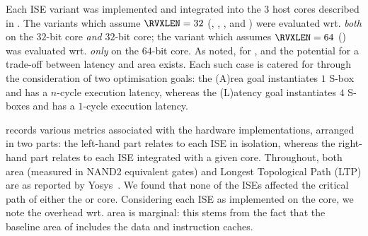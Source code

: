 
Each ISE variant was implemented and integrated into the $3$ host cores 
described in .
The variants which assume  $\RVXLEN = 32$
(, , , and ) 
were evaluated wrt.
{\em both}
on the
$32$-bit  core
{\em  and}
$32$-bit  core;
the variant  which assumes $\RVXLEN = 64$
()
was  evaluated wrt.
{\em only}
on the
$64$-bit  core.
As noted, for ,  and  the potential for a trade-off
between latency and area exists.  Each such case is catered for through
the consideration of two optimisation goals:
the (A)rea    goal
instantiates $1$ S-box   and has a $n$-cycle execution latency,
whereas
the (L)atency goal
instantiates $4$ S-boxes and has a $1$-cycle execution latency.

records
various metrics 
associated with the hardware implementations, 
arranged in two parts: 
the  left-hand part relates to each ISE in isolation,
whereas 
the right-hand part relates to each ISE integrated with a given core.
Throughout, both area (measured in NAND2 equivalent gates) and Longest 
Topological Path (LTP) are as reported by Yosys~\cite{yosys}.  We found 
that none of the ISEs affected the critical path of either the  
or  core.
Considering each ISE as implemented on the  core, we note the 
overhead wrt. area is marginal: this stems from the fact that the 
baseline area of  includes the data and instruction caches.

